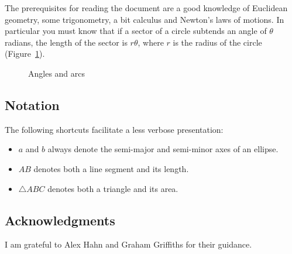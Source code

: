 The prerequisites for reading the document are a good knowledge of Euclidean geometry, some trigonometry, a bit calculus and Newton's laws of motions. In particular you must know that if a sector of a circle subtends an angle of $\theta$ radians, the length of the sector is $r\theta$, where $r$ is the radius of the circle (Figure~\ref{f.radians}).

\begin{figure}[t]
\begin{center}
\caption{Angles and arcs}\label{f.radians}
\end{center}
\end{figure}

\subsection*{Notation}

The following shortcuts facilitate a less verbose presentation:
\begin{itemize}
\item $a$ and $b$ always denote the semi-major and semi-minor axes of an ellipse.
\item $AB$ denotes both a line segment and its length.
\item $\triangle ABC$ denotes both a triangle and its area.
\end{itemize}

\subsection*{Acknowledgments}

I am grateful to Alex Hahn and Graham Griffiths for their guidance.
